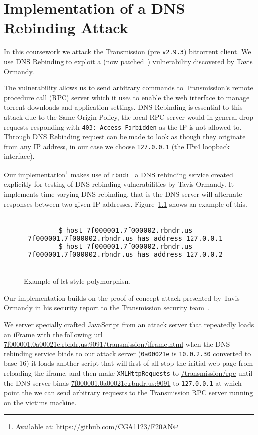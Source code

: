 \chapter{Implementation of a DNS Rebinding Attack}
\label{implementation}

In this coursework we attack the Transmission (pre \texttt{v2.9.3}) bittorrent
client. We use DNS Rebinding to exploit a (now patched~\cite{transmission_pr})
vulnerability discovered by Tavis Ormandy.

The vulnerability allows us to send arbitrary commands to Transmission's remote
procedure call (RPC) server which it uses to enable the web interface to manage
torrent downloads and application settings. DNS Rebinding is essential to this
attack due to the Same-Origin Policy, the local RPC server would in general
drop requests responding with \texttt{403: Access Forbidden} as the IP is not
allowed to. Through DNS Rebinding request can be made to look as though they
originate from any IP address, in our case we choose \texttt{127.0.0.1} (the
IPv4 loopback interface).

Our implementation\footnote{Available at:
\url{https://github.com/CGA1123/F20AN}} makes use of
\texttt{rbndr}~\cite{rbndr} a DNS rebinding service created explicitly for
testing of DNS rebinding vulnerabilities by Tavis Ormandy. It implements
time-varying DNS rebinding, that is the DNS server will alternate responses
between two given IP addresses. Figure~\ref{rbndr_host} shows an example of
this.

\begin{figure}[H]
\begin{center}
\begin{tabular}{c}
\begin{lstlisting}
$ host 7f000001.7f000002.rbndr.us
7f000001.7f000002.rbndr.us has address 127.0.0.1
$ host 7f000001.7f000002.rbndr.us
7f000001.7f000002.rbndr.us has address 127.0.0.2
\end{lstlisting}
\end{tabular}
\end{center}
\caption{Example of let-style polymorphism}
\label{rbndr_host}
\end{figure}

Our implementation builds on the proof of concept attack presented by Tavis
Ormandy in his security report to the Transmission security
team~\cite{tavis_report}.

We server specially crafted JavaScript from an attack server that repeatedly
loads an iFrame with the following url
\url{7f000001.0a00021e.rbndr.us:9091/transmission/iframe.html} when the DNS
rebinding service binds to our attack server (\texttt{0a00021e} is
\texttt{10.0.2.30} converted to base 16) it loads another script that will
first of all stop the initial web page from reloading the iframe, and then make
\texttt{XMLHttpRequests} to \url{/transmission/rpc} until the DNS server binds
\url{7f000001.0a00021e.rbndr.us:9091} to \texttt{127.0.0.1} at which point the
we can send arbitrary requests to the Transmission RPC server running on the
victims machine.

